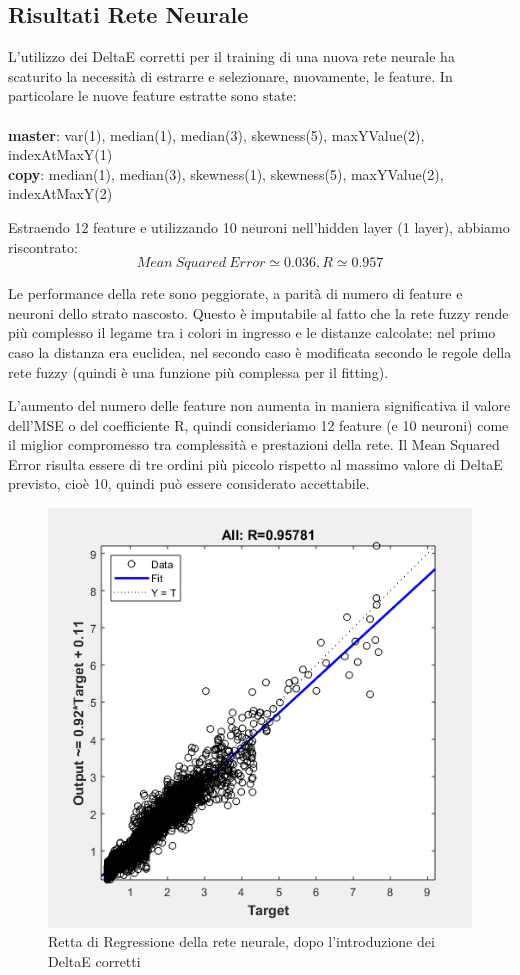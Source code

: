 \subsection{Risultati Rete Neurale}
L'utilizzo dei DeltaE corretti per il training di una nuova rete neurale ha scaturito la necessità di estrarre e selezionare, nuovamente, le feature. In particolare le nuove feature estratte sono state:
\\\\
\textbf{master}: var(1), median(1), median(3), skewness(5), maxYValue(2), indexAtMaxY(1)
\\
\textbf{copy}: median(1), median(3), skewness(1), skewness(5), maxYValue(2), indexAtMaxY(2)

Estraendo 12 feature e utilizzando 10 neuroni nell'hidden layer (1 layer), abbiamo riscontrato:
\[Mean\ Squared\ Error \simeq 0.036, R \simeq 0.957\]

Le performance della rete sono peggiorate, a parità di numero di feature e neuroni dello strato nascosto. Questo è imputabile al fatto che la rete fuzzy rende più complesso il legame tra i colori in ingresso e le distanze calcolate: nel primo caso la distanza era euclidea, nel secondo caso è modificata secondo le regole della rete fuzzy (quindi è una funzione più complessa per il fitting).

L'aumento del numero delle feature non aumenta in maniera significativa il valore dell'MSE o del coefficiente R, quindi consideriamo 12 feature (e 10 neuroni) come il miglior compromesso tra complessità e prestazioni della rete. Il Mean Squared Error risulta essere di tre ordini più piccolo rispetto al massimo valore di DeltaE previsto, cioè 10, quindi può essere considerato accettabile.

\begin{figure}[!ht]
\begin{center}
	\includegraphics[scale=1]{images/rete2-regression.PNG}
\end{center}
\caption{Retta di Regressione della rete neurale, dopo l'introduzione dei DeltaE corretti}
\end{figure}